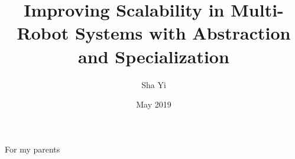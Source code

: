 \documentclass[12pt]{cmuthesis}
\theoremstyle{plain}
\begin{document}
 
\frontmatter

\pagestyle{empty}

\title{ %
{\bf Improving Scalability in Multi-Robot Systems with Abstraction and Specialization}}
\author{Sha Yi}
\date{May 2019}
\trnumber{}


\support{}
\disclaimer{}



\maketitle

\begin{dedication}
For my parents
\end{dedication}

\pagestyle{plain} %

\end{document}

